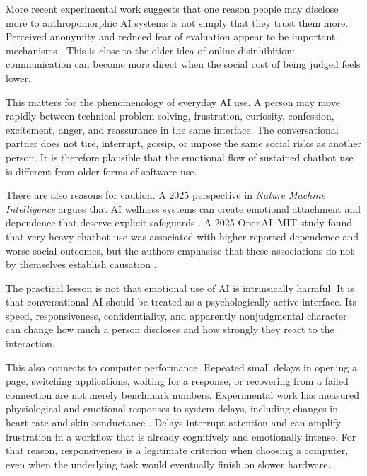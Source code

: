 \medskip\noindent
More recent experimental work suggests that
one reason people may disclose more to
anthropomorphic AI systems is not simply
that they trust them more.  Perceived
anonymity and reduced fear of evaluation
appear to be important mechanisms
\cite{rahman-2026-chatbot-disclosure}.
This is close to the older idea of online
disinhibition: communication can become
more direct when the social cost of being
judged feels lower.

\medskip\noindent
This matters for the phenomenology of
everyday AI use.  A person may move rapidly
between technical problem solving,
frustration, curiosity, confession,
excitement, anger, and reassurance in the
same interface.  The conversational partner
does not tire, interrupt, gossip, or impose
the same social risks as another person.
It is therefore plausible that the
emotional flow of sustained chatbot use is
different from older forms of software use.

\medskip\noindent
There are also reasons for caution.
A 2025 perspective in
\emph{Nature Machine Intelligence} argues
that AI wellness systems can create
emotional attachment and dependence that
deserve explicit safeguards
\cite{defreitas-cohen-2025}.
A 2025 OpenAI--MIT study found that very
heavy chatbot use was associated with
higher reported dependence and worse
social outcomes, but the authors emphasize
that these associations do not by
themselves establish causation
\cite{fang-et-al-2025-chatbot}.

\medskip\noindent
The practical lesson is not that emotional
use of AI is intrinsically harmful.  It is
that conversational AI should be treated as
a psychologically active interface.
Its speed, responsiveness, confidentiality,
and apparently nonjudgmental character can
change how much a person discloses and how
strongly they react to the interaction.

\medskip\noindent
This also connects to computer performance.
Repeated small delays in opening a page,
switching applications, waiting for a
response, or recovering from a failed
connection are not merely benchmark
numbers.  Experimental work has measured
physiological and emotional responses to
system delays, including changes in heart
rate and skin conductance
\cite{trimmel-meixner-haring-2003}.
Delays interrupt attention and can amplify
frustration in a workflow that is already
cognitively and emotionally intense.  For
that reason, responsiveness is a legitimate
criterion when choosing a computer, even
when the underlying task would eventually
finish on slower hardware.

